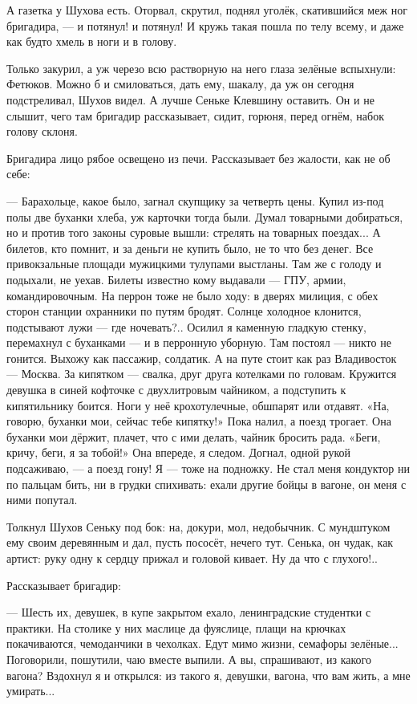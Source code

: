 А газетка у Шухова есть. Оторвал, скрутил, поднял уголёк, скатившийся меж ног бригадира, --- и
потянул! и потянул! И кружь такая пошла по телу всему, и даже как будто хмель в ноги и в голову.

Только закурил, а уж черезо всю растворную на него глаза зелёные вспыхнули: Фетюков. Можно б
и смиловаться, дать ему, шакалу, да уж он сегодня подстреливал, Шухов видел. А лучше Сеньке
Клевшину оставить. Он и не слышит, чего там бригадир рассказывает, сидит, горюня, перед огнём,
набок голову склоня.

Бригадира лицо рябое освещено из печи. Рассказывает без жалости, как не об себе:

--- Барахольце, какое было, загнал скупщику за четверть цены. Купил из-под полы две буханки
хлеба, уж карточки тогда были. Думал товарными добираться, но и против того законы суровые
вышли: стрелять на товарных поездах... А билетов, кто помнит, и за деньги не купить было, не то
что без денег. Все привокзальные площади мужицкими тулупами выстланы. Там же с голоду и
подыхали, не уехав. Билеты известно кому выдавали --- ГПУ, армии, командировочным. На перрон
тоже не было ходу: в дверях милиция, с обех сторон станции охранники по путям бродят. Солнце
холодное клонится, подстывают лужи --- где ночевать?.. Осилил я каменную гладкую стенку,
перемахнул с буханками --- и в перронную уборную. Там постоял --- никто не гонится. Выхожу как
пассажир, солдатик. А на путе стоит как раз Владивосток --- Москва. За кипятком --- свалка, друг
друга котелками по головам. Кружится девушка в синей кофточке с двухлитровым чайником, а
подступить к кипятильнику боится. Ноги у неё крохотулечные, обшпарят или отдавят. «На,
говорю, буханки мои, сейчас тебе кипятку!» Пока налил, а поезд трогает. Она буханки мои
дёржит, плачет, что с ими делать, чайник бросить рада. «Беги, кричу, беги, я за тобой!» Она
впереде, я следом. Догнал, одной рукой подсаживаю, --- а поезд гону! Я --- тоже на подножку. Не
стал меня кондуктор ни по пальцам бить, ни в грудки спихивать: ехали другие бойцы в вагоне, он
меня с ними попутал.

Толкнул Шухов Сеньку под бок: на, докури, мол, недобычник. С мундштуком ему своим деревянным и
дал, пусть пососёт, нечего тут. Сенька, он чудак, как артист: руку одну к сердцу прижал и
головой кивает. Ну да что с глухого!..

Рассказывает бригадир:

--- Шесть их, девушек, в купе закрытом ехало, ленинградские студентки с практики. На столике у
них маслице да фуяслице, плащи на крючках покачиваются, чемоданчики в чехолках. Едут мимо
жизни, семафоры зелёные... Поговорили, пошутили, чаю вместе выпили. А вы, спрашивают, из какого
вагона? Вздохнул я и открылся: из такого я, девушки, вагона, что вам жить, а мне умирать...

